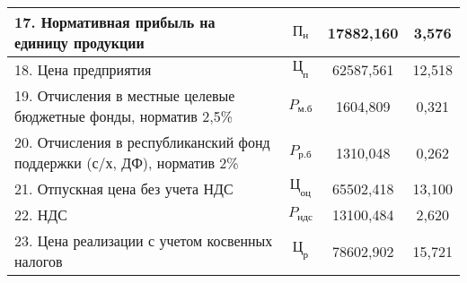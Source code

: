 {\begin{longtable}{| m{10.7cm} | c | c | c |}
      17. Нормативная прибыль на единицу продукции
      & \( \text{П}_{\text{н}} \) & 17882{,}160 & 3{,}576 \\
      \hline

      18. Цена предприятия
      & \( \mathbf{\text{Ц}_{\text{п}}} \) & 62587{,}561 & 12{,}518 \\
      \hline

      19. Отчисления в местные целевые бюджетные фонды, \newline
      норматив 2{,}5\%
      & \( P_{\text{м.б}} \) & 1604{,}809 & 0{,}321 \\
      \hline

      20. Отчисления в республиканский фонд поддержки \newline
      (с/х, ДФ), норматив 2\%
      & \( P_{\text{р.б}} \) & 1310{,}048 & 0{,}262 \\
      \hline

      21. Отпускная цена без учета НДС
      & \( \text{Ц}_{\text{оц}} \) & 65502{,}418 & 13{,}100 \\
      \hline

      22. НДС
      & \( P_{\text{ндс}} \) & 13100{,}484 & 2{,}620 \\
      \hline

      23. Цена реализации с учетом косвенных налогов
      & \( \text{Ц}_{\text{р}} \) & 78602{,}902 & 15{,}721 \\
      \hline 
\end{longtable}
}
